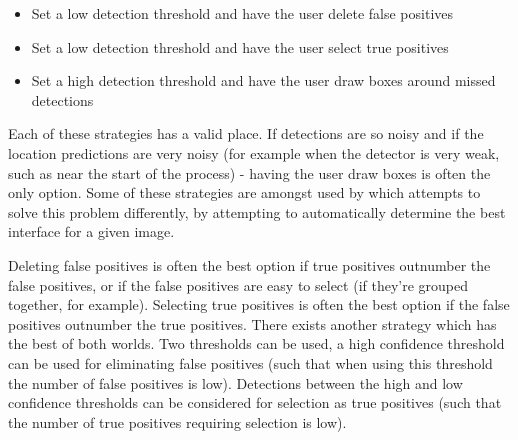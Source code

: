 \begin{itemize}
    \item Set a low detection threshold and have the user delete false positives
    \item Set a low detection threshold and have the user select true positives
    \item Set a high detection threshold and have the user draw boxes around missed detections
\end{itemize}

Each of these strategies has a valid place. If detections are so noisy and if the location predictions are very noisy (for example when the detector is very weak, such as near the start of the process) - having the user draw boxes is often the only option. Some of these strategies are amongst used by \cite{Konyushkova2017} which attempts to solve this problem differently, by attempting to automatically determine the best interface for a given image.

Deleting false positives is often the best option if true positives outnumber the false positives, or if the false positives are easy to select (if they're grouped together, for example). Selecting true positives is often the best option if the false positives outnumber the true positives. 
There exists another strategy which has the best of both worlds. Two thresholds can be used, a high confidence threshold can be used for eliminating false positives (such that when using this threshold the number of false positives is low). Detections between the high and low confidence thresholds can be considered for selection as true positives (such that the number of true positives requiring selection is low).


